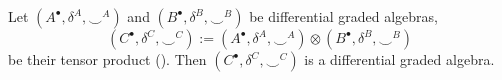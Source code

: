 \begin{proposition}
  Let $(A^\bullet, \delta^A, \smile^A)$ and $(B^\bullet, \delta^B, \smile^B)$
  be differential graded algebras,
  \begin{equation}
    (C^\bullet, \delta^C, \smile^C)
    := (A^\bullet, \delta^A, \smile^A) \otimes (B^\bullet, \delta^B, \smile^B)
  \end{equation}
  be their tensor product
  ().
  Then $(C^\bullet, \delta^C, \smile^C)$ is a differential graded algebra.
\end{proposition}
